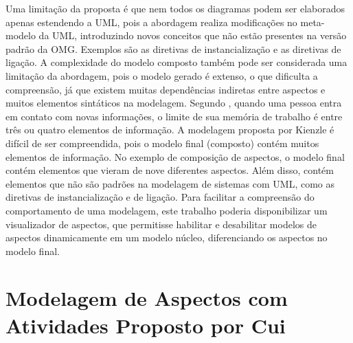 Uma limitação da proposta é que nem todos os diagramas podem ser elaborados apenas estendendo a UML, pois a abordagem realiza modificações no
meta-modelo da UML, introduzindo novos conceitos que não estão presentes na versão padrão da OMG. Exemplos são as diretivas de instancialização e as diretivas de ligação. 
A complexidade do modelo composto também pode ser considerada uma limitação da abordagem, pois o modelo gerado é extenso, o que dificulta a
compreensão, já que existem muitas dependências indiretas entre aspectos e muitos elementos sintáticos na modelagem. Segundo \cite{seventwo:11},
quando uma pessoa entra em contato com novas informações, o limite de sua memória de trabalho é entre três ou quatro elementos de informação. A
modelagem proposta por Kienzle é difícil de ser compreendida, pois o modelo final (composto) contém muitos
elementos de informação. No exemplo de composição de aspectos, o modelo final contém elementos que vieram de nove diferentes aspectos. Além disso, contém elementos
que não são padrões na modelagem de sistemas com UML, como as diretivas de instancialização e de ligação. Para facilitar a compreensão do
comportamento de uma modelagem, este trabalho poderia disponibilizar um visualizador de aspectos, que permitisse habilitar e desabilitar
modelos de aspectos dinamicamente em um modelo núcleo, diferenciando os aspectos no modelo final.

\section{Modelagem de Aspectos com Atividades Proposto por Cui}

